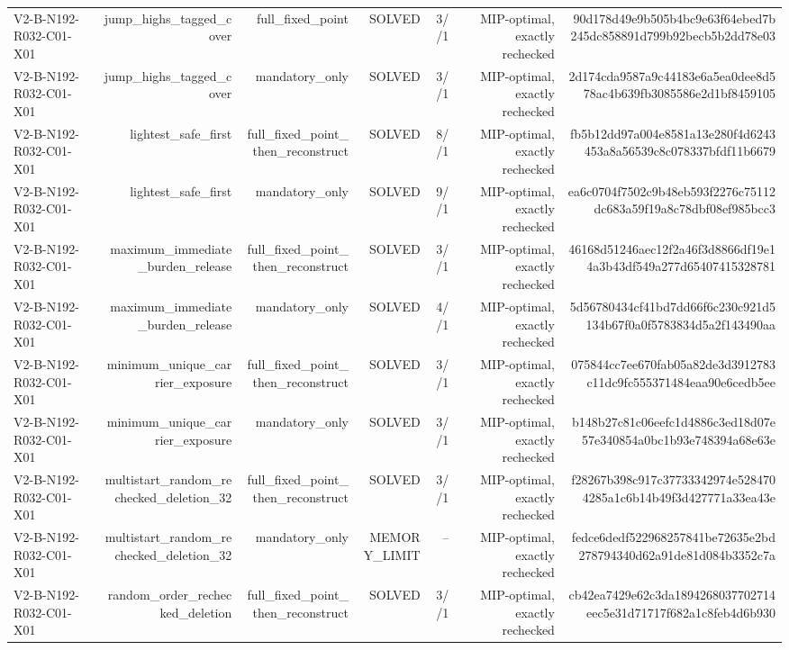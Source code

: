 {\begin{longtable}{lrrrrrr}
V2-B-N192-R032-C01-X01 & jump\_highs\_tagged\_cover & full\_fixed\_point & SOLVED & 3//1 & MIP-optimal, exactly rechecked & 90d178d49e9b505b4bc9e63f64ebed7b245dc858891d799b92becb5b2dd78e03 \\
V2-B-N192-R032-C01-X01 & jump\_highs\_tagged\_cover & mandatory\_only & SOLVED & 3//1 & MIP-optimal, exactly rechecked & 2d174cda9587a9c44183e6a5ea0dee8d578ac4b639fb3085586e2d1bf8459105 \\
V2-B-N192-R032-C01-X01 & lightest\_safe\_first & full\_fixed\_point\_then\_reconstruct & SOLVED & 8//1 & MIP-optimal, exactly rechecked & fb5b12dd97a004e8581a13e280f4d6243453a8a56539c8c078337bfdf11b6679 \\
V2-B-N192-R032-C01-X01 & lightest\_safe\_first & mandatory\_only & SOLVED & 9//1 & MIP-optimal, exactly rechecked & ea6c0704f7502c9b48eb593f2276c75112dc683a59f19a8c78dbf08ef985bcc3 \\
V2-B-N192-R032-C01-X01 & maximum\_immediate\_burden\_release & full\_fixed\_point\_then\_reconstruct & SOLVED & 3//1 & MIP-optimal, exactly rechecked & 46168d51246aec12f2a46f3d8866df19e14a3b43df549a277d65407415328781 \\
V2-B-N192-R032-C01-X01 & maximum\_immediate\_burden\_release & mandatory\_only & SOLVED & 4//1 & MIP-optimal, exactly rechecked & 5d56780434cf41bd7dd66f6c230c921d5134b67f0a0f5783834d5a2f143490aa \\
V2-B-N192-R032-C01-X01 & minimum\_unique\_carrier\_exposure & full\_fixed\_point\_then\_reconstruct & SOLVED & 3//1 & MIP-optimal, exactly rechecked & 075844cc7ee670fab05a82de3d3912783c11dc9fc555371484eaa90e6cedb5ee \\
V2-B-N192-R032-C01-X01 & minimum\_unique\_carrier\_exposure & mandatory\_only & SOLVED & 3//1 & MIP-optimal, exactly rechecked & b148b27c81c06eefc1d4886c3ed18d07e57e340854a0bc1b93e748394a68e63e \\
V2-B-N192-R032-C01-X01 & multistart\_random\_rechecked\_deletion\_32 & full\_fixed\_point\_then\_reconstruct & SOLVED & 3//1 & MIP-optimal, exactly rechecked & f28267b398c917c37733342974e5284704285a1c6b14b49f3d427771a33ea43e \\
V2-B-N192-R032-C01-X01 & multistart\_random\_rechecked\_deletion\_32 & mandatory\_only & MEMORY\_LIMIT & -- & MIP-optimal, exactly rechecked & fedce6dedf522968257841be72635e2bd278794340d62a91de81d084b3352c7a \\
V2-B-N192-R032-C01-X01 & random\_order\_rechecked\_deletion & full\_fixed\_point\_then\_reconstruct & SOLVED & 3//1 & MIP-optimal, exactly rechecked & cb42ea7429e62c3da1894268037702714eec5e31d71717f682a1c8feb4d6b930 \\

\end{longtable}}
